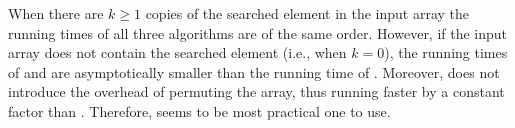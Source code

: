 When there are $k\ge1$ copies of the searched element in the input array the running times of all three algorithms are of the same order.
However, if the input array does not contain the searched element (i.e., when $k=0$), the running times of  and  are asymptotically smaller than the running time of .
Moreover,  does not introduce the overhead of permuting the array, thus running faster by a constant factor than .
Therefore,  seems to be most practical one to use.

